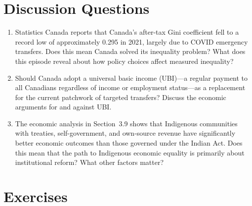\section*{Discussion Questions}

\begin{enumerate}

\item Statistics Canada reports that Canada's after-tax Gini coefficient fell to a record low of approximately 0.295 in 2021, largely due to COVID emergency transfers. Does this mean Canada solved its inequality problem? What does this episode reveal about how policy choices affect measured inequality?

\item Should Canada adopt a universal basic income (UBI)---a regular payment to all Canadians regardless of income or employment status---as a replacement for the current patchwork of targeted transfers? Discuss the economic arguments for and against UBI.

\item The economic analysis in Section~3.9 shows that Indigenous communities with treaties, self-government, and own-source revenue have significantly better economic outcomes than those governed under the Indian Act. Does this mean that the path to Indigenous economic equality is primarily about institutional reform? What other factors matter?

\end{enumerate}

\section*{Exercises}

